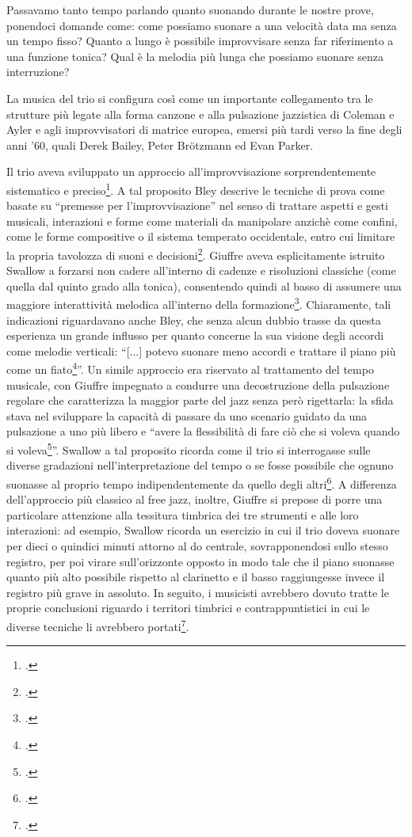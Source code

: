\begin{fquote}
	Passavamo tanto tempo parlando quanto suonando durante le nostre prove, ponendoci domande come: come possiamo suonare a una velocità data ma senza un tempo fisso? Quanto a lungo è possibile improvvisare senza far riferimento a una funzione tonica? Qual è la melodia più lunga che possiamo suonare senza interruzione?
\end{fquote}
La musica del trio si configura così come un importante collegamento tra le strutture più legate alla forma canzone e alla pulsazione jazzistica di Coleman e Ayler e agli improvvisatori di matrice europea, emersi più tardi verso la fine degli anni '60, quali Derek Bailey, Peter Brötzmann ed Evan Parker.\par
 Il trio aveva sviluppato un approccio all'improvvisazione sorprendentemente sistematico e preciso\footcite[387]{johnston}. A tal proposito Bley descrive le tecniche di prova come basate su ``premesse per l'improvvisazione'' nel senso di trattare aspetti e gesti musicali, interazioni e forme come materiali da manipolare anzichè come confini, come le forme compositive o il sistema temperato occidentale, entro cui limitare la propria tavolozza di suoni e decisioni\footcite[389]{johnston}. Giuffre aveva esplicitamente istruito Swallow a forzarsi non cadere all'interno di cadenze e risoluzioni classiche (come quella dal quinto grado alla tonica), consentendo quindi al basso di assumere una maggiore interattività melodica all'interno della formazione\footcite[390]{johnston}. Chiaramente, tali indicazioni riguardavano anche Bley, che senza alcun dubbio trasse da questa esperienza un grande influsso per quanto concerne la sua visione degli accordi come melodie verticali: ``[...] potevo suonare meno accordi e trattare il piano più come un fiato\footcite[390]{johnston}''. Un simile approccio era riservato al trattamento del tempo musicale, con Giuffre impegnato a condurre una decostruzione della pulsazione regolare che caratterizza la maggior parte del jazz senza però rigettarla: la sfida stava nel sviluppare la capacità di passare da uno scenario guidato da una pulsazione a uno più libero e ``avere la flessibilità di fare ciò che si voleva quando si voleva\footcite[390]{johnston}''. Swallow a tal proposito ricorda come il trio si interrogasse sulle diverse gradazioni nell'interpretazione del tempo o se fosse possibile che ognuno suonasse al proprio tempo indipendentemente da quello degli altri\footcite[390]{johnston}. A differenza dell'approccio più classico al free jazz, inoltre, Giuffre si prepose di porre una particolare attenzione alla tessitura timbrica dei tre strumenti e alle loro interazioni: ad esempio, Swallow ricorda un esercizio in cui il trio doveva suonare per dieci o quindici minuti attorno al do centrale, sovrapponendosi sullo stesso registro, per poi virare sull'orizzonte opposto in modo tale che il piano suonasse quanto più alto possibile rispetto al clarinetto e il basso raggiungesse invece il registro più grave in assoluto. In seguito, i musicisti avrebbero dovuto tratte le proprie conclusioni riguardo i territori timbrici e contrappuntistici in cui le diverse tecniche li avrebbero portati\footcite[391]{johnston}. \par
